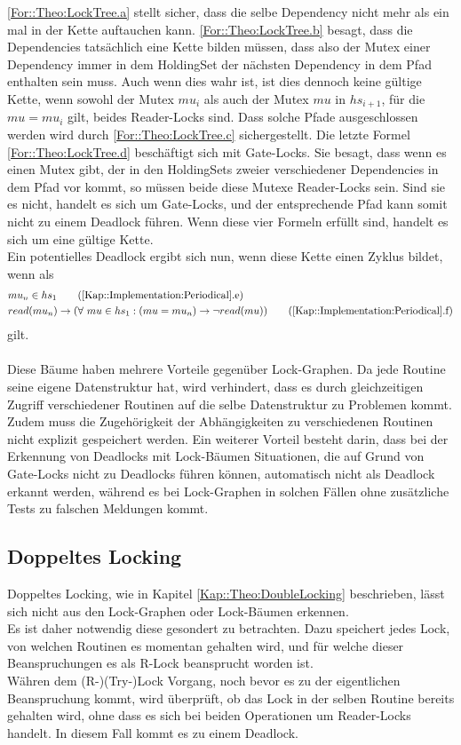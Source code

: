 \eqref{For::Theo:LockTree.a} stellt sicher, dass die selbe 
Dependency nicht mehr als ein mal in der Kette auftauchen kann.  
\eqref{For::Theo:LockTree.b} besagt, dass die Dependencies tatsächlich
eine Kette bilden müssen, dass also der Mutex einer Dependency immer in dem 
HoldingSet der nächsten Dependency in dem Pfad enthalten sein muss. 
Auch wenn dies wahr ist, ist dies dennoch keine gültige Kette, wenn sowohl der
Mutex $mu_i$ als auch der Mutex $mu$ in $hs_{i+1}$, für die $mu = mu_i$ gilt, 
beides Reader-Locks sind. Dass solche Pfade ausgeschlossen werden wird durch 
\eqref{For::Theo:LockTree.c} sichergestellt. Die letzte Formel 
\eqref{For::Theo:LockTree.d} beschäftigt sich mit Gate-Locks. 
Sie besagt, dass wenn es einen Mutex gibt, 
der in den HoldingSets zweier verschiedener Dependencies in dem Pfad vor kommt, 
so müssen beide diese Mutexe Reader-Locks sein. Sind sie es nicht, handelt es 
sich um Gate-Locks, und der entsprechende Pfad kann somit nicht zu einem 
Deadlock führen. Wenn diese vier Formeln erfüllt sind, handelt es sich um eine 
gültige Kette.\\
Ein potentielles Deadlock ergibt sich nun, wenn diese Kette einen Zyklus 
bildet, wenn als 
\begin{align}
  &mu_n \in hs_{1} 
  \tag{\ref{Kap::Implementation:Periodical}.e}
  \label{For::Implementation:Periodical.e}\\
  &read(mu_n) \rightarrow 
  (\forall\ mu \in hs_{1}: (mu = mu_n) \to \lnot read(mu))
  \tag{\ref{Kap::Implementation:Periodical}.f}
  \label{For::Implementation:Periodical.f}
\end{align}
gilt.\\\\
Diese Bäume haben mehrere Vorteile gegenüber Lock-Graphen. Da jede Routine seine 
eigene Datenstruktur hat, wird verhindert, dass es durch 
gleichzeitigen Zugriff verschiedener Routinen auf die selbe Datenstruktur zu 
Problemen kommt. Zudem muss die Zugehörigkeit der Abhängigkeiten zu 
verschiedenen Routinen nicht explizit gespeichert werden. Ein weiterer Vorteil 
besteht darin, dass bei der Erkennung von Deadlocks mit Lock-Bäumen Situationen,
die auf Grund von Gate-Locks nicht zu Deadlocks führen können, automatisch nicht
als Deadlock erkannt werden, während es bei Lock-Graphen in solchen Fällen ohne 
zusätzliche Tests zu falschen Meldungen kommt.  

\subsection{Doppeltes Locking}
Doppeltes Locking, wie in Kapitel \ref{Kap::Theo:DoubleLocking} beschrieben,
 lässt sich nicht aus den Lock-Graphen oder Lock-Bäumen erkennen.\\
Es ist daher notwendig diese gesondert zu betrachten. Dazu speichert jedes Lock, 
von welchen Routinen es momentan gehalten wird, und für welche dieser 
Beanspruchungen es als R-Lock beansprucht worden ist.\\
Währen dem (R-)(Try-)Lock Vorgang, noch bevor es zu der eigentlichen Beanspruchung 
kommt, wird überprüft, ob das Lock in der selben Routine bereits gehalten 
wird, ohne dass es sich bei beiden Operationen um Reader-Locks handelt. In diesem 
Fall kommt es zu einem Deadlock.
